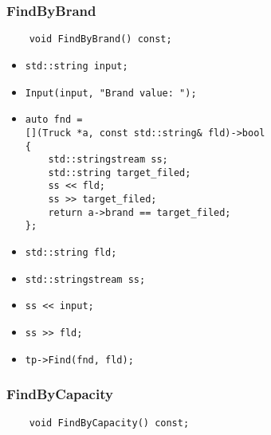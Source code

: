 \subsubsection*{FindByBrand}

\begin{lstlisting}
    void FindByBrand() const;
\end{lstlisting}

\begin{itemize}
	\item \verb|std::string input;|
    \item \verb|Input(input, "Brand value: ");|
    \item \verb|auto fnd =|\\
    \verb|[](Truck *a, const std::string& fld)->bool|\\
    \verb|{|\\
    \verb|    std::stringstream ss;|\\
    \verb|    std::string target_filed;|\\
    \verb|    ss << fld;|\\
    \verb|    ss >> target_filed;|\\
    \verb|    return a->brand == target_filed;|\\
    \verb|};|
    \item \verb|std::string fld;|
    \item \verb|std::stringstream ss;|
    \item \verb|ss << input;|
    \item \verb|ss >> fld;|
    \item \verb|tp->Find(fnd, fld);|
\end{itemize}



\subsubsection*{FindByCapacity}

\begin{lstlisting}
    void FindByCapacity() const;
\end{lstlisting}

